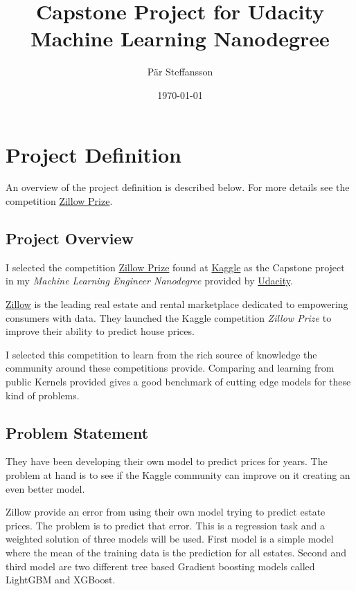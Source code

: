 \documentclass[a4paper]{article}
\title{Capstone Project for Udacity Machine Learning Nanodegree}
\author{Pär Steffansson}
\date{\today}
\begin{document}
\maketitle

\tableofcontents

\section{Project Definition}
An overview of the project definition is described below. For more details see the competition
\href{https://www.kaggle.com/c/zillow-prize-1#description}{Zillow Prize}.

\subsection{Project Overview}
%
%
I selected the competition \href{https://www.kaggle.com/c/zillow-prize-1#description}{Zillow Prize} found at \href{https://www.kaggle.com}{Kaggle} as the Capstone project in my \textit{Machine Learning Engineer Nanodegree} provided by \href{https://www.udacity.com}{Udacity}.

\href{https://www.zillow.com}{Zillow} is the leading real estate and rental marketplace dedicated to empowering consumers with data. They launched the Kaggle competition \textit{Zillow Prize} to improve their ability to predict house prices.

I selected this competition to learn from the rich source of knowledge the community around these competitions provide. Comparing and learning from public Kernels provided gives a good benchmark of cutting edge models for these kind of problems.

\subsection{Problem Statement}
%
%
They have been developing their own model to predict prices for years. The problem at hand is to see if the Kaggle community can improve on it creating an even better model. 

Zillow provide an error from using their own model trying to predict estate prices. The problem is to predict that error. This is a regression task and a weighted solution of three models will be used. First model is a simple model where the mean of the training data is the prediction for all estates. Second and third model are two different tree based Gradient boosting models called LightGBM and XGBoost.
\end{document}

